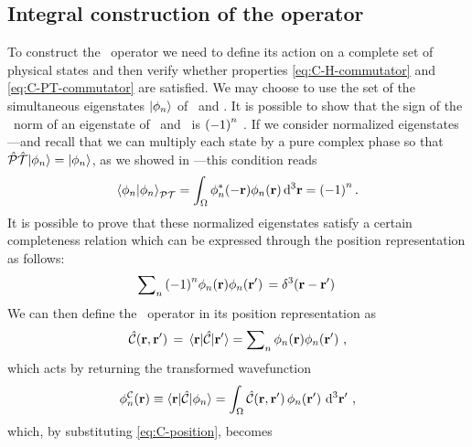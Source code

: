        \subsection{Integral construction of the \texorpdfstring{\hC}{C} operator}
            To construct the \hC\ operator we need to define its action on a complete set of physical states and then verify whether properties \eqref{eq:C-H-commutator} and \eqref{eq:C-PT-commutator} are satisfied. We may choose to use the set of the simultaneous eigenstates $\ket{\phi_n}$ of \hH\ and \hPT. It is possible to show that the sign of the \PT\ norm of an eigenstate of \hH\ and \hPT\ is $\pqty{-1}^n$ \cite{bender2024}. If we consider normalized eigenstates---and recall that we can multiply each state by a pure complex phase so that $\mathcal{\hat{P}}\mathcal{\hat{T}}\!\ket{\phi_n} = \ket{\phi_n}$, as we showed in ---this condition reads \cite{Bender2002,bender2024}
            \begin{equation*}
                \braket{\phi_n}{\phi_n}_{\PT} 
                = \int\nolimits_\Omega \phi_n^*\pqty{-\vb{r}} \phi_n\pqty{\vb{r}} \dd[3]{\vb{r}}
                = \pqty{-1}^n
                \myperiod
            \end{equation*}
            It is possible to prove \cite{bender2024,Weigert2003} that these normalized eigenstates satisfy a certain completeness relation which can be expressed through the position representation as follows:
            \begin{equation}
                \sum\nolimits_n \pqty{-1}^n\phi_n\pqty{\vb{r}}\phi_n\pqty*{\vb{r}'} = \delta^3\pqty*{\vb{r}-\vb{r}'}
            \end{equation}
            We can then define the \hC\ operator in its position representation as
            \begin{equation}
                \label{eq:C-position}
                \hC\pqty*{\vb{r},\vb{r}'}
                = \mel{\vb{r}}{\hC}{\vb{r}'}
                = \sum\nolimits_n \phi_n\pqty{\vb{r}}\phi_n\pqty*{\vb{r}'}
                \mycomma
            \end{equation}
            which acts by returning the transformed wavefunction
            \begin{equation*}
                \phi_n^\mcC\pqty{\vb{r}}
                \equiv\! \mel{\vb{r}}{\hC}{\phi_n}
                = \int\nolimits_\Omega \hC\pqty*{\vb{r},\vb{r}'} \phi_n\pqty*{\vb{r}'} \dd[3]{\vb{r}'}
                \mycomma
            \end{equation*}
            which, by substituting \eqref{eq:C-position}, becomes
